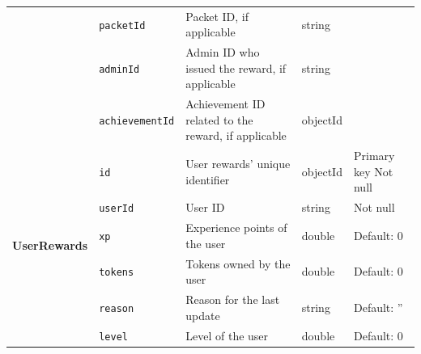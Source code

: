 \begin{landscape}
\begin{longtable}{ | m{} | m{} | m{} | m{} | m{} | }
        \cline{2-5}
                                                                         & \texttt{packetId}                         & Packet ID, if applicable                                             & string        &                               \\
        \cline{2-5}
                                                                         & \texttt{adminId}                          & Admin ID who issued the reward, if applicable                        & string        &                               \\
        \cline{2-5}
                                                                         & \texttt{achievementId}                    & Achievement ID related to the reward, if applicable                  & objectId      &                               \\
        \hline
        \multirow[t]{10}{5em}{\textbf{UserRewards}}                      & \texttt{id}                               & User rewards' unique identifier                                      & objectId      & Primary key \newline Not null \\
        \cline{2-5}
                                                                         & \texttt{userId}                           & User ID                                                              & string        & Not null                      \\
        \cline{2-5}
                                                                         & \texttt{xp}                               & Experience points of the user                                        & double        & Default: 0                    \\
        \cline{2-5}
                                                                         & \texttt{tokens}                           & Tokens owned by the user                                             & double        & Default: 0                    \\
        \cline{2-5}
                                                                         & \texttt{reason}                           & Reason for the last update                                           & string        & Default: ''                   \\
        \cline{2-5}
                                                                         & \texttt{level}                            & Level of the user                                                    & double        & Default: 0                    \\

\end{longtable}
\end{landscape}
